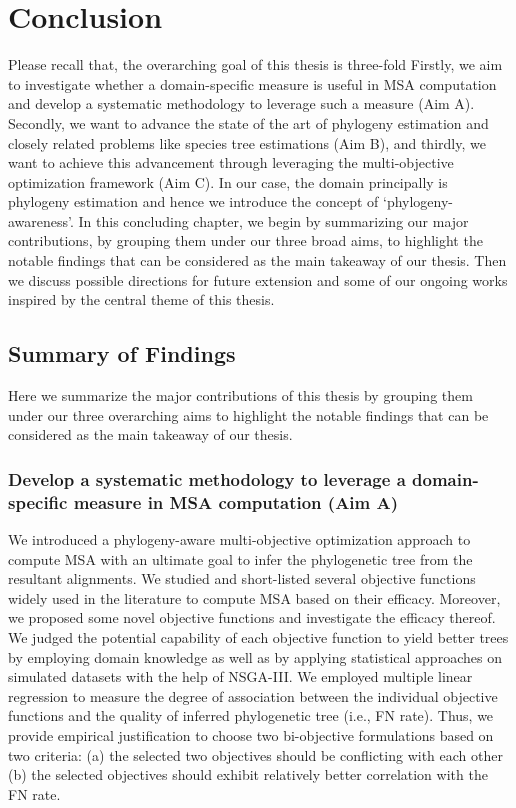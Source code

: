 \chapter{Conclusion}\label{ch:conclusion}
Please recall that, the overarching goal of this thesis is three-fold Firstly, we aim to investigate whether a domain-specific measure is useful in MSA computation and develop a systematic methodology to leverage such a measure (Aim A). Secondly, we want to advance the state of the art of phylogeny estimation and closely related problems like species tree estimations (Aim B), and thirdly, we want to achieve this advancement through leveraging the multi-objective optimization framework (Aim C). In our case, the domain principally is phylogeny estimation and hence we introduce the concept of ‘phylogeny-awareness’. In this concluding chapter, we begin by summarizing our major contributions, by grouping them under our three broad aims, to highlight the notable findings that can be considered as the main takeaway of our thesis. Then we discuss possible directions for future extension and some of our ongoing works inspired by the central theme of this thesis.

\section{Summary of Findings}
Here we summarize the major contributions of this thesis by grouping them under our three overarching aims to highlight the notable findings that can be considered as the main takeaway of our thesis. 

\subsection{Develop a systematic methodology to leverage a domain-specific measure in MSA computation (Aim A)}
We introduced a phylogeny-aware multi-objective optimization approach to compute MSA with an ultimate goal to infer the phylogenetic tree from the resultant alignments. We studied and short-listed several objective functions widely used in the literature to compute MSA based on their efficacy. Moreover, we proposed some novel objective functions and investigate the efficacy thereof. We judged the potential capability of each objective function to yield better trees by employing domain knowledge as well as by applying statistical approaches on simulated datasets with the help of NSGA-III. We employed multiple linear regression to measure the degree of association between the individual objective functions and the quality of inferred phylogenetic tree (i.e., FN rate). Thus, we provide empirical justification to choose two bi-objective formulations based on two criteria: (a) the selected two objectives should be conflicting with each other (b) the selected objectives should exhibit relatively better correlation with the FN rate. 


